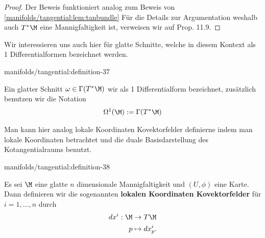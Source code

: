 \documentclass[letterpaper,10pt,german]{jupyterBook}
\begin{document}
\begin{proof}
 Der Beweis funktioniert analog zum Beweis von \cref{manifolds/tangential:lem:tanbundle}  Für die Details zur Argumentation weshalb auch \(T^\ast\M\) eine Mannigfaltigkeit ist, verweisen wir auf \cite{Lee03} Prop. 11.9.
\end{proof}

\par
Wir interessieren uns auch hier für glatte Schnitte, welche in diesem Kontext als 1 Differentialformen bezeichnet werden.
\begin{definition}{}{manifolds/tangential:definition-37}



\par
Ein glatter Schnitt \(\omega\in\Gamma(T^\ast\M)\) wir als 1 Differentialform bezeichnet, zusätzlich benutzen wir die Notation
\begin{align*}
\Omega^1(\M) := \Gamma(T^\ast\M)
\end{align*}\end{definition}

\par
Man kann hier analog lokale Koordinaten Kovektorfelder definierne indem man lokale Koordinaten betrachtet und die duale Basisdarstellung des Kotangentialraums benutzt.
\begin{definition}{}{manifolds/tangential:definition-38}



\par
Es sei \(\M\) eine glatte \(n\) dimensionale Mannigfaltigkeit und \((U,\phi)\) eine Karte.
Dann definieren wir die sogenannten \textbf{lokalen Koordinaten Kovektorfelder} für \(i=1,\ldots,n\) durch
\begin{align*}
dx^{i}:\M&\to T\M\\
p&\mapsto dx^{i}_p.\end{align*}\end{definition}
\end{document}
